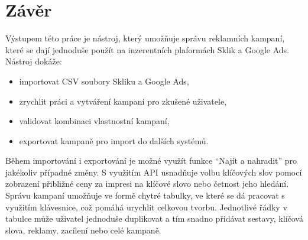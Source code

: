 \chapter{Závěr}
\label{chap:conclusion}
Výstupem této práce je nástroj, který umožňuje správu reklamních kampaní, které se dají jednoduše použít na inzerentních
plaformách Sklik a Google Ads. Nástroj dokáže:
\begin{itemize}
    \item importovat CSV soubory Skliku a Google Ads,
    \item zrychlit práci a vytváření kampaní pro zkušené uživatele,
    \item validovat kombinaci vlastnostní kampaní,
    \item exportovat kampaně pro import do dalších systémů.
\end{itemize}
Během importování i exportování je možné využít funkce \enquote{Najít a nahradit} pro jakékoliv případné změny.
S využitím API usnadňuje volbu klíčových slov pomocí zobrazení přibližné ceny za impresi na klíčové slovo nebo četnost jeho hledání.
Správu kampaní umožňuje ve formě chytré tabulky, ve které se dá pracovat s využitím klávesnice, což pomáhá urychlit celkovou tvorbu.
Jednotlivé řádky v tabulce může uživatel jednoduše duplikovat a tím snadno přidávat sestavy, klíčová slova, reklamy, zacílení nebo celé kampaně.

\endinput